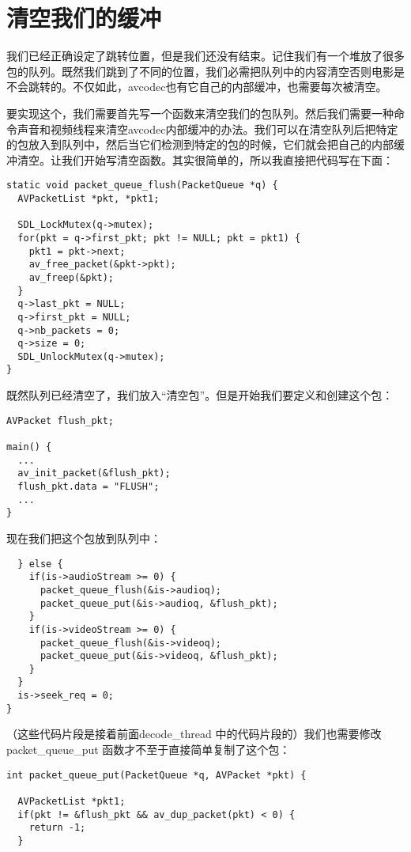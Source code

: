\section{清空我们的缓冲}

我们已经正确设定了跳转位置，但是我们还没有结束。记住我们有一个堆放了很多包的队列。既然我们跳到了不同的位置，我们必需把队列中的内容清空否则电影是不会跳转的。不仅如此，avcodec也有它自己的内部缓冲，也需要每次被清空。

要实现这个，我们需要首先写一个函数来清空我们的包队列。然后我们需要一种命令声音和视频线程来清空avcodec内部缓冲的办法。我们可以在清空队列后把特定的包放入到队列中，然后当它们检测到特定的包的时候，它们就会把自己的内部缓冲清空。让我们开始写清空函数。其实很简单的，所以我直接把代码写在下面：
\begin{lstlisting}
static void packet_queue_flush(PacketQueue *q) {
  AVPacketList *pkt, *pkt1;

  SDL_LockMutex(q->mutex);
  for(pkt = q->first_pkt; pkt != NULL; pkt = pkt1) {
    pkt1 = pkt->next;
    av_free_packet(&pkt->pkt);
    av_freep(&pkt);
  }
  q->last_pkt = NULL;
  q->first_pkt = NULL;
  q->nb_packets = 0;
  q->size = 0;
  SDL_UnlockMutex(q->mutex);
}
\end{lstlisting}

既然队列已经清空了，我们放入“清空包”。但是开始我们要定义和创建这个包：

\begin{lstlisting}
AVPacket flush_pkt;

main() {
  ...
  av_init_packet(&flush_pkt);
  flush_pkt.data = "FLUSH";
  ...
}
\end{lstlisting}

现在我们把这个包放到队列中：

\begin{lstlisting}
  } else {
    if(is->audioStream >= 0) {
      packet_queue_flush(&is->audioq);
      packet_queue_put(&is->audioq, &flush_pkt);
    }
    if(is->videoStream >= 0) {
      packet_queue_flush(&is->videoq);
      packet_queue_put(&is->videoq, &flush_pkt);
    }
  }
  is->seek_req = 0;
}
\end{lstlisting}

（这些代码片段是接着前面decode_thread 中的代码片段的）我们也需要修改packet_queue_put 函数才不至于直接简单复制了这个包：

\begin{lstlisting}
int packet_queue_put(PacketQueue *q, AVPacket *pkt) {

  AVPacketList *pkt1;
  if(pkt != &flush_pkt && av_dup_packet(pkt) < 0) {
    return -1;
  }
\end{lstlisting}

